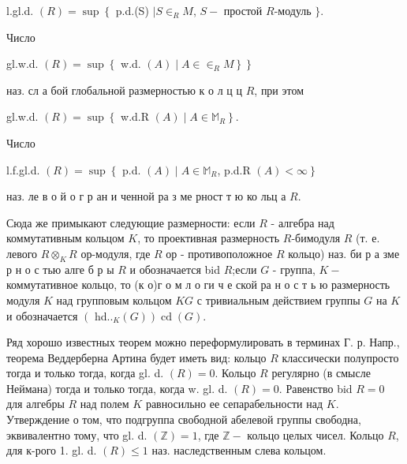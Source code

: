 \documentclass[10pt]{article}
\begin{document}
l.gl.d. $(R)=\sup \left\{\right.$ p.d.(S) $\mid S \in_{R} M$, $S-$ простой $R$-модуль $\}$.



Число



gl.w.d. $(R)=\sup \left\{\right.$ w.d. $\left.\left.(A) \mid A \in \in_{R} M\right\}\right\}$



наз. сл а бой глобальной размерностью к о л ц ц $R$, при этом



gl.w.d. $(R)=\sup \left\{\right.$ w.d.R $\left.(A) \mid A \in \mathbb{M}_{R}\right\}$.



Число



l.f.gl.d. $(R)=\sup \left\{\right.$ p.d. $(A) \mid A \in \mathbb{M}_{R}$, p.d.R $\left.(A)<\infty\right\}$



наз. ле в о й о г р ан и ченной ра з ме рност т ю ко льц а $R$.



Сюда же примыкают следующие размерности: если $R$ - алгебра над коммутативным кольцом $K$, то проективная размерность $R$-бимодуля $R$ (т. е. левого $R \otimes_{K} R$ ор-модуля, где $R$ ор - противоположное $R$ кольцо) наз. би р а зме р н о с тью алге б р ы $R$ и обозначается bid $R$;если $G$ - группа, $K-$ коммутативное кольцо, то (к о)г о м л о ги ч е ской ра н о с т ь ю размерность модуля $K$ над групповым кольцом $K G$ с тривиальным действием группы $G$ на $K$ и обозначается $\left(\right.$ hd..$\left._{K}(G)\right) \operatorname{cd}(G)$.



Ряд хорошо известных теорем можно переформулировать в терминах Г. р. Напр., теорема Веддерберна Артина будет иметь вид: кольцо $R$ классически полупросто тогда и только тогда, когда gl. d. $(R)=0$. Кольцо $R$ регулярно (в смысле Неймана) тогда и только тогда, когда w. gl. d. $(R)=0$. Равенство bid $R=0$ для алгебры $R$ над полем $K$ равносильно ее сепарабельности над $K$. Утверждение о том, что подгруппа свободной абелевой группы свободна, эквивалентно тому, что gl. d. $(\mathbb{Z})=1$, где $\mathbb{Z}-$ кольцо целых чисел. Кольцо $R$, для к-рого 1. gl. d. $(R) \leqslant 1$ наз. наследственным слева кольцом.
\end{document}
